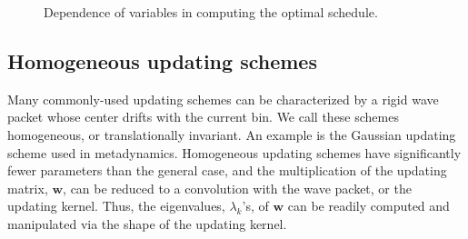 \documentclass[reprint, floatfix]{revtex4-1}
\newcommand{\Err}{E}
\begin{document}
\begin{figure}
\caption{
  \label{fig:vardep}
  Dependence of variables in computing
  the optimal schedule.
}
\end{figure}


\subsection{\label{sec:band-matrix}
Homogeneous updating schemes}



Many commonly-used updating schemes
can be characterized by a rigid wave packet
whose center drifts with the current bin.
%
We call these schemes homogeneous,
or translationally invariant.
%
An example is the Gaussian updating scheme
used in metadynamics.
%
Homogeneous updating schemes have significantly fewer
parameters than the general case,
and the multiplication of the updating matrix,
$\mathbf w$,
can be reduced to a convolution with the wave packet,
or the updating kernel.
%
Thus,
the eigenvalues, $\lambda_k$'s, of $\mathbf w$
can be readily computed and manipulated
via the shape of the updating kernel.
\end{document}
